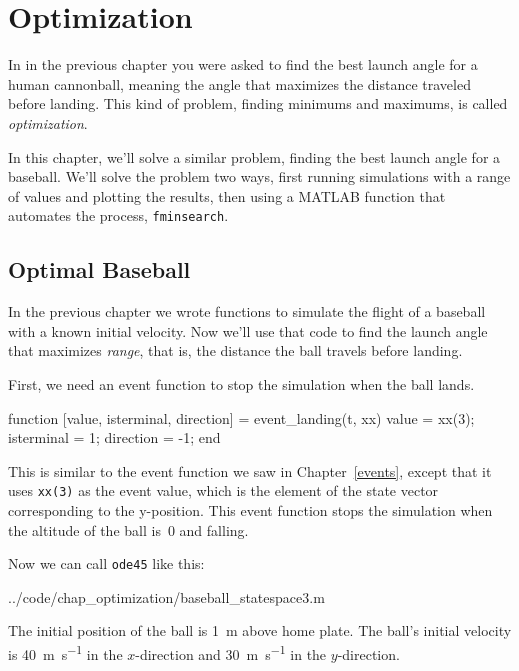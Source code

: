 \chapter{Optimization}


In  in the previous chapter you were asked to find the best launch angle for a human cannonball, meaning the angle that maximizes the distance traveled before landing.  This kind of problem, finding minimums and maximums, is called \emph{optimization}.

In this chapter, we'll solve a similar problem, finding the best launch angle for a baseball.
We'll solve the problem two ways, first running simulations with a range of values and plotting the results, then using a MATLAB function that automates the process, \lstinline{fminsearch}.

\section{Optimal Baseball}

In the previous chapter we wrote functions to simulate the flight of a baseball with a known initial velocity.  Now we'll use that code to find the launch angle that maximizes \emph{range}, that is, the distance the ball travels before landing.


First, we need an event function to stop the simulation when the ball lands.
\begin{code}
function [value, isterminal, direction] = event_landing(t, xx)
    value = xx(3);
    isterminal = 1;
    direction = -1;
end
\end{code}


This is similar to the event function we saw in Chapter~\ref{events}, except that it uses \lstinline{xx(3)} as the event value, which is the element of the state vector corresponding to the y-position.  This event function stops the simulation when the altitude of the ball is~0 and falling.

Now we can call \lstinline{ode45} like this:

{../code/chap_optimization/baseball_statespace3.m}


The initial position of the ball is \SI{1}{\meter} above home plate.  The ball's initial velocity is \SI{40}{\meter\per\second} in the $x$-direction and \SI{30}{\meter\per\second} in the $y$-direction.

